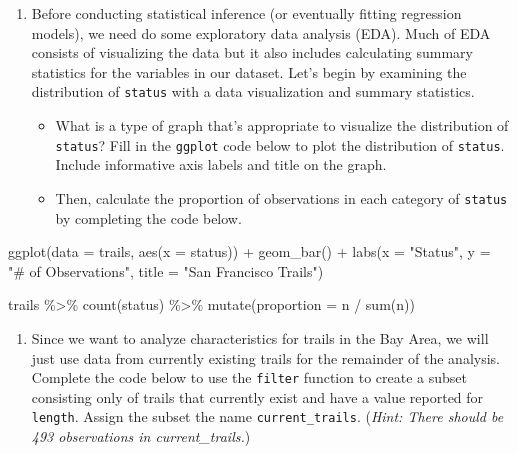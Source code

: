 \documentclass[
]{article}
\newenvironment{Shaded}{\begin{snugshade}}{\end{snugshade}}
\newcommand{\AttributeTok}[1]{\textcolor[rgb]{0.77,0.63,0.00}{#1}}
\newcommand{\FunctionTok}[1]{\textcolor[rgb]{0.00,0.00,0.00}{#1}}
\newcommand{\NormalTok}[1]{#1}
\newcommand{\SpecialCharTok}[1]{\textcolor[rgb]{0.00,0.00,0.00}{#1}}
\newcommand{\StringTok}[1]{\textcolor[rgb]{0.31,0.60,0.02}{#1}}
\providecommand{\tightlist}{%
  \setlength{\itemsep}{0pt}\setlength{\parskip}{0pt}}
\begin{document}
\begin{enumerate}
\def\labelenumi{\arabic{enumi}.}
\setcounter{enumi}{1}
\item
  Before conducting statistical inference (or eventually fitting
  regression models), we need do some exploratory data analysis (EDA).
  Much of EDA consists of visualizing the data but it also includes
  calculating summary statistics for the variables in our dataset. Let's
  begin by examining the distribution of \texttt{status} with a data
  visualization and summary statistics.

  \begin{itemize}
  \item
    What is a type of graph that's appropriate to visualize the
    distribution of \texttt{status}? Fill in the \texttt{ggplot} code
    below to plot the distribution of \texttt{status}. Include
    informative axis labels and title on the graph.
  \item
    Then, calculate the proportion of observations in each category of
    \texttt{status} by completing the code below.
  \end{itemize}
\end{enumerate}

\begin{Shaded}
\begin{Highlighting}[]
\FunctionTok{ggplot}\NormalTok{(}\AttributeTok{data =}\NormalTok{ trails, }\FunctionTok{aes}\NormalTok{(}\AttributeTok{x =}\NormalTok{ status)) }\SpecialCharTok{+} 
  \FunctionTok{geom\_bar}\NormalTok{() }\SpecialCharTok{+} 
  \FunctionTok{labs}\NormalTok{(}\AttributeTok{x =} \StringTok{"Status"}\NormalTok{, }
       \AttributeTok{y =} \StringTok{"\# of Observations"}\NormalTok{, }
       \AttributeTok{title =} \StringTok{"San Francisco Trails"}\NormalTok{)}
\end{Highlighting}
\end{Shaded}

\begin{Shaded}
\begin{Highlighting}[]
\NormalTok{trails }\SpecialCharTok{\%\textgreater{}\%}
  \FunctionTok{count}\NormalTok{(status) }\SpecialCharTok{\%\textgreater{}\%}
  \FunctionTok{mutate}\NormalTok{(}\AttributeTok{proportion =}\NormalTok{ n }\SpecialCharTok{/} \FunctionTok{sum}\NormalTok{(n))}
\end{Highlighting}
\end{Shaded}

\begin{enumerate}
\def\labelenumi{\arabic{enumi}.}
\setcounter{enumi}{2}
\tightlist
\item
  Since we want to analyze characteristics for trails in the Bay Area,
  we will just use data from currently existing trails for the remainder
  of the analysis. Complete the code below to use the \texttt{filter}
  function to create a subset consisting only of trails that currently
  exist and have a value reported for \texttt{length}. Assign the subset
  the name \texttt{current\_trails}. (\emph{Hint: There should be 493
  observations in current\_trails.})
\end{enumerate}
\end{document}
